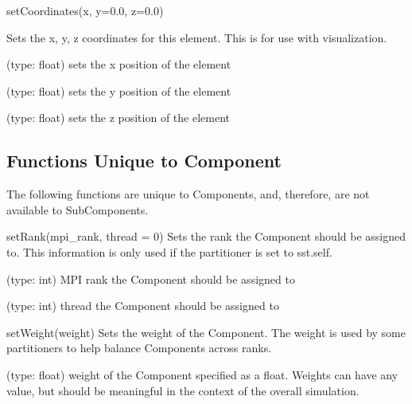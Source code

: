 \begin{functiondoc}{setCoordinates(x, y=0.0, z=0.0)}{

  Sets the x, y, z coordinates for this element.  This is for use with
  visualization.
}

   (type: float) sets the x position of the element
  
   (type: float) sets the y position of the element
  
   (type: float) sets the z position of the element

  \noreturn

\end{functiondoc}
  
  
\subsection{Functions Unique to Component}

The following functions are unique to Components, and, therefore, are
not available to SubComponents.

\begin{functiondoc}{setRank(mpi_rank, thread = 0)}{
  Sets the rank the Component should be assigned to.  This information
  is only used if the partitioner is set to sst.self.  }

   (type: int) MPI rank the Component should be
  assigned to

   (type: int) thread the Component should be assigned
  to

  \noreturn
\end{functiondoc}
  
\begin{functiondoc}{setWeight(weight)}{
  Sets the weight of the Component.  The weight is used by some
  partitioners to help balance Components across ranks.
}

 (type: float) weight of the Component specified as a
float.  Weights can have any value, but should be meaningful in the
context of the overall simulation.

\noreturn
\end{functiondoc}

